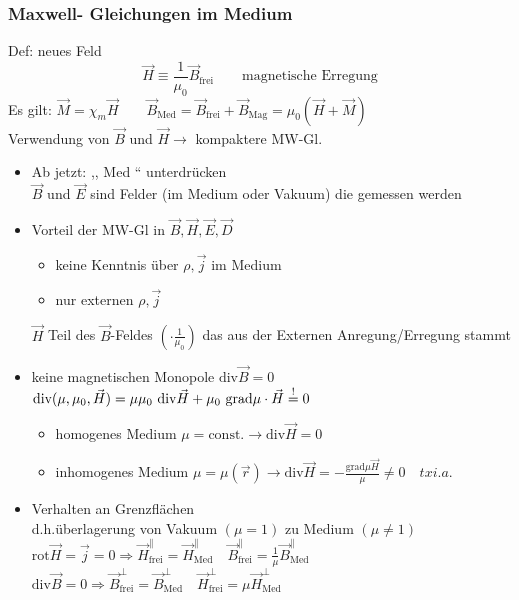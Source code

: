 \documentclass[titlepage,12pt,a4paper,ngerman]{report}
\newcommand{\tx}[1]{\textrm{#1}}
\newcommand{\grad}{\tx{grad}}
\begin{document}
\subsubsection{Maxwell- Gleichungen im Medium}
Def: neues Feld 
$$ \vec{H} \equiv \frac{1}{\mu_0} \vec{B}_{\tx{frei}} \qquad \tx{magnetische Erregung}$$
Es gilt: $ \vec{M} = \chi_m \vec{H} \qquad \vec{B}_{\tx{Med}} = \vec{B}_{\tx{frei}}+ \vec{B}_{\tx{Mag}} = \mu_0 (\vec{H} + \vec{M})$\\
Verwendung von $ \vec{B} $ und $ \vec{H} \rightarrow $ kompaktere MW-Gl.\\
\begin{itemize}
	\item Ab jetzt: ,, Med `` unterdrücken \\
	$ \vec{B} $ und $ \vec{E} $ sind Felder (im Medium oder Vakuum) die gemessen werden
	\item Vorteil der MW-Gl in $ \vec{B}, \vec{H}, \vec{E}, \vec{D} $
	\begin{itemize}
		\item keine Kenntnis über $ \rho, \vec{j} $ im Medium
		\item nur externen $ \rho, \vec{j} $
	\end{itemize}
	$ \vec{H} $ Teil des $ \vec{B} $-Feldes $ ( \cdot \frac{1}{\mu_0}) $ das aus der Externen Anregung/Erregung stammt
	\item keine magnetischen Monopole $ \tx{div} \vec{B} = 0 $\\
	$ \tx{div}(\mu,\mu_0,\vec{H}) = \mu \mu_0 \tx{ div} \vec{H} + \mu_0 \  \grad \mu \cdot \vec{H} \buildrel ! \over = 0 $
	\begin{itemize}
		\item homogenes Medium $ \mu = \tx{const.}  \rightarrow \tx{div} \vec{H} = 0 $
		\item inhomogenes Medium $ \mu = \mu(\vec{r}) \rightarrow \tx{div} \vec{H} = - \frac{\grad \mu \vec{H}}{\mu} \neq 0 \quad tx{i.a.} $
	\end{itemize}
	\item Verhalten an Grenzflächen\\
	d.h.überlagerung von Vakuum $ (\mu = 1) $ zu Medium $ (\mu \neq 1) $\\
	$ \tx{rot} \vec{H} = \vec{j} = 0 \Rightarrow \vec{H}^{\parallel}_{\tx{frei}} = \vec{H}^{\parallel}_{\tx{Med}} \quad \vec{B}^{\parallel}_{\tx{frei}} = \frac{1}{\mu} \vec{B}^{\parallel}_{\tx{Med}} $\\
	$ \tx{div} \vec{B} = 0 \Rightarrow \vec{B}^{\perp}_{\tx{frei}} = \vec{B}^{\perp}_{\tx{Med}} \quad \vec{H}^{\perp}_{\tx{frei}} = \mu \vec{H}^{\perp}_{\tx{Med}} $
\end{itemize}
\end{document}
